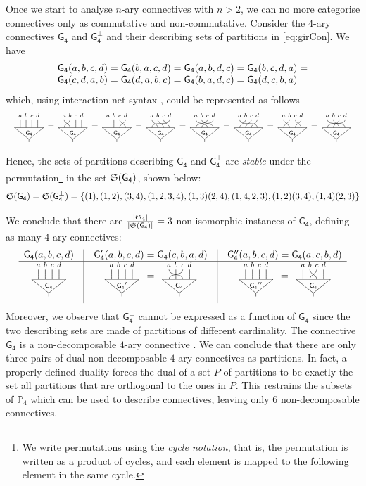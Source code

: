 \documentclass{lmcs} %
\def\set#1{\{#1\}}
\def\cneg#1{{#1^\bot}}
\newcommand{\sizeof}[1]{|#1|}
\theoremstyle{plain}
\def\gcon{\mathsf{G_4}}
\def\gconp{\mathsf{G_4'}}
\def\gconpp{\mathsf{G_4''}}
\def\ngcon{\mathsf{\cneg{G_4}}}
\def\partof#1{\mathbb P_{#1}}
\begin{document}
Once we start to analyse $n$-ary connectives with $n>2$, we can no more categorise  connectives only as {commutative} and {non-commutative}.
Consider the  $4$-ary connectives $\gcon$  and $\ngcon$ and their describing sets of partitions in \ref{eq:girCon}.
We have
$$
\begin{array}{r@{\;=\;}c@{\;=\;}c@{\;=\;}l}
	\gcon(a,b,c,d)&
	\gcon(b,a,c,d)&
	\gcon(a,b,d,c)&
	\gcon(b,c,d,a) =
	\\
	\gcon(c,d,a,b)&
	\gcon(d,a,b,c)&
	\gcon(b,a,d,c)&
	\gcon(d,c,b,a)
\end{array}
$$
which, using interaction net  syntax \cite{lafont:95},  could be represented as follows
$$
\begin{array}{c@{=}c@{=}c@{=}c@{=}c@{=}c@{=}c@{=}c}
\gcongate{1}{2}{3}{4}&
\gcongate{2}{1}{3}{4}&
\gcongate{1}{2}{4}{3}&
\gcongate{2}{3}{4}{1}&
\gcongate{3}{4}{1}{2}&
\gcongate{4}{1}{2}{3}&
\gcongate{2}{1}{4}{3}&
\gcongate{4}{3}{2}{1}
\end{array}
$$
%
Hence, the sets of partitions describing $\gcon$ and $\ngcon$ are \emph{stable} under the permutation\footnote{We write permutations using the \emph{cycle notation}, that is, the permutation is written as a product of cycles, and each element is mapped to the following element in the same cycle.} in the set $\symgroupof{\gcon}$, shown below:
$$
\symgroupof{\gcon}=\symgroupof{\ngcon}=\set{
	(1),
	(1,2),
	(3,4),
	(1,2,3,4), (1,3)(2,4),(1,4,2,3),
	(1,2)(3,4),
	(1,4)(2,3)
}
$$

We conclude that there are $\frac{\sizeof{\symgroup_4}}{\sizeof{\symgroupof{\gcon}}}=3$  non-isomorphic instances of $\gcon$, defining as many $4$-ary connectives:
$$
\begin{array}{c@{\quad}|@{\quad}c@{\quad}|@{\quad}c}
\gcon(a,b,c,d)
&
\gconp(a,b,c,d)=\gcon(c,b,a,d)
&
\gconpp(a,b,c,d)=\gcon(a,c,b,d)
\\
\hline
\gcongate{1}{2}{3}{4}
&
\gcongatep{1}{2}{3}{4}
=
\gcongate{3}{2}{1}{4}
&
\gcongates{1}{2}{3}{4}
=
\gcongate{1}{3}{2}{4}
\end{array}
$$
Moreover, we observe that $\ngcon$ cannot be expressed as a function of $\gcon$ since the two describing sets are made of partitions of different cardinality.
The connective $\gcon$ is a non-decomposable $4$-ary connective \cite{mai:19,acc:mai:20}. We can conclude that there are only three pairs of dual non-decomposable $4$-ary connectives-as-partitions.
In fact, a properly defined duality forces the dual of a set $P$ of partitions to be exactly the set all partitions that are orthogonal to the ones in $P$. This restrains the subsets of $\partof{4}$ which can be used to describe connectives, leaving only $6$ non-decomposable connectives.
\end{document}
